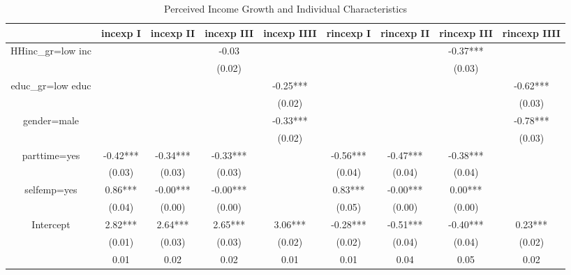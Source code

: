 
\begin{table}[p]
\centering
\begin{adjustbox}{width={0.9\textwidth}}
\begin{threeparttable}
\caption{Perceived Income Growth and Individual Characteristics}
\label{micro_reg_exp}\begin{tabular}{ccccccccc}
\toprule
{} &  incexp I & incexp II & incexp III & incexp IIII & rincexp I & rincexp II & rincexp III & rincexp IIII \\
\midrule
HHinc\_gr=low inc &           &           &      -0.03 &             &           &            &    -0.37*** &              \\
                 &           &           &     (0.02) &             &           &            &      (0.03) &              \\
educ\_gr=low educ &           &           &            &    -0.25*** &           &            &             &     -0.62*** \\
                 &           &           &            &      (0.02) &           &            &             &       (0.03) \\
gender=male      &           &           &            &    -0.33*** &           &            &             &     -0.78*** \\
                 &           &           &            &      (0.02) &           &            &             &       (0.03) \\
parttime=yes     &  -0.42*** &  -0.34*** &   -0.33*** &             &  -0.56*** &   -0.47*** &    -0.38*** &              \\
                 &    (0.03) &    (0.03) &     (0.03) &             &    (0.04) &     (0.04) &      (0.04) &              \\
selfemp=yes      &   0.86*** &  -0.00*** &   -0.00*** &             &   0.83*** &   -0.00*** &     0.00*** &              \\
                 &    (0.04) &    (0.00) &     (0.00) &             &    (0.05) &     (0.00) &      (0.00) &              \\
Intercept        &   2.82*** &   2.64*** &    2.65*** &     3.06*** &  -0.28*** &   -0.51*** &    -0.40*** &      0.23*** \\
                 &    (0.01) &    (0.03) &     (0.03) &      (0.02) &    (0.02) &     (0.04) &      (0.04) &       (0.02) \\
                 &      0.01 &      0.02 &       0.02 &        0.01 &      0.01 &       0.04 &        0.05 &         0.02 \\

\end{tabular}
\end{threeparttable}
\end{adjustbox}
\end{table}
